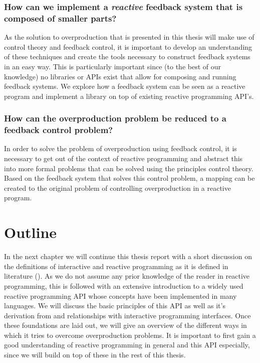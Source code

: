 \subsubsection*{How can we implement a \emph{reactive} feedback system that is composed of smaller parts?} 
As the solution to overproduction that is presented in this thesis will make use of control theory and feedback control, it is important to develop an understanding of these techniques and create the tools necessary to construct feedback systems in an easy way. This is particularly important since (to the best of our knowledge) no libraries or APIs exist that allow for composing and running feedback systems. We explore how a feedback system can be seen as a reactive program and implement a library on top of existing reactive programming API's.

\subsubsection*{How can the overproduction problem be reduced to a feedback control problem?}
In order to solve the problem of overproduction using feedback control, it is necessary to get out of the context of reactive programming and abstract this into more formal problems that can be solved using the principles control theory. Based on the feedback system that solves this control problem, a mapping can be created to the original problem of controlling overproduction in a reactive program.


\section*{Outline}
In the next chapter we will continue this thesis report with a short discussion on the definitions of interactive and reactive programming as it is defined in literature (). As we do not assume any prior knowledge of the reader in reactive programming, this is followed with an extensive introduction to a widely used reactive programming API whose concepts have been implemented in many languages. We will discuss the basic principles of this API as well as it's derivation from and relationships with interactive programming interfaces. Once these foundations are laid out, we will give an overview of the different ways in which it tries to overcome overproduction problems. It is important to first gain a good understanding of reactive programming in general and this API especially, since we will build on top of these in the rest of this thesis.

